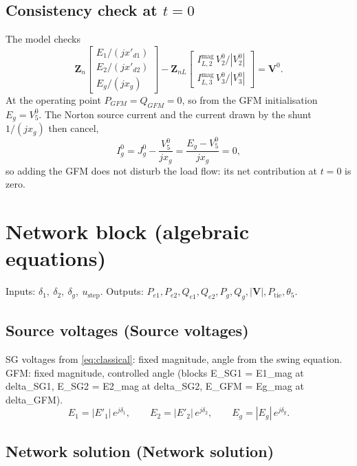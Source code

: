 \documentclass[11pt,a4paper]{article}
\numberwithin{equation}{section}
\newcommand{\blk}[1]{\textsf{#1}}
\begin{document}
\subsection{Consistency check at $t=0$}
The model checks
\begin{equation}
\bm Z_n\begin{bmatrix} E_1/(jx'_{d1})\\ E_2/(jx'_{d2})\\ E_g/(jx_g)\end{bmatrix}
- \bm Z_{nL}\begin{bmatrix} I_{L,2}^{\text{mag}}\,V_2^0/|V_2^0|\\ I_{L,3}^{\text{mag}}\,V_3^0/|V_3^0|\end{bmatrix} = \bm V^0 .
\end{equation}
At the operating point $P_{GFM}=Q_{GFM}=0$, so from the GFM initialisation $E_g = V_5^0$. The Norton source current and the current drawn by the shunt $1/(jx_g)$ then cancel,
\begin{equation}
I_g^0 = J_g^0 - \frac{V_5^0}{jx_g} = \frac{E_g - V_5^0}{jx_g} = 0,
\end{equation}
so adding the GFM does not disturb the load flow: its net contribution at $t=0$ is zero.

\section{Network block (algebraic equations)}
Inputs: $\delta_1,\ \delta_2,\ \delta_g,\ u_{\text{step}}$.
Outputs: $P_{e1}, P_{e2}, Q_{e1}, Q_{e2}, P_g, Q_g, |\bm V|, P_{\text{tie}}, \theta_5$.

\subsection{Source voltages (\blk{Source voltages})}
SG voltages from \eqref{eq:classical}: fixed magnitude, angle from the swing equation. GFM: fixed magnitude, controlled angle (blocks \blk{E\_SG1 = E1\_mag at delta\_SG1}, \blk{E\_SG2 = E2\_mag at delta\_SG2}, \blk{E\_GFM = Eg\_mag at delta\_GFM}).
\begin{equation}
E_1 = |E'_1|\,e^{j\delta_1},\qquad
E_2 = |E'_2|\,e^{j\delta_2},\qquad
E_g = |E_g|\,e^{j\delta_g}.
\end{equation}

\subsection{Network solution (\blk{Network solution})}\label{sec:network-solution}
\end{document}
